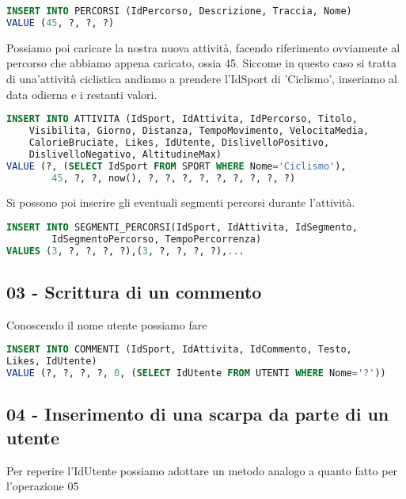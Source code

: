 \documentclass[12pt]{report}
\begin{document}
\begin{lstlisting}[style=sql, language=SQL, label=lst:sql-query]
INSERT INTO PERCORSI (IdPercorso, Descrizione, Traccia, Nome)
VALUE (45, ?, ?, ?)
\end{lstlisting}

Possiamo poi caricare la nostra nuova attività, facendo riferimento ovviamente al percorso
che abbiamo appena caricato, ossia 45. Siccome in questo caso si tratta di una'attività
ciclistica andiamo a prendere l'IdSport di 'Ciclismo', inseriamo al data odierna e i restanti valori.
\begin{lstlisting}[style=sql, language=SQL, label=lst:sql-query]
INSERT INTO ATTIVITA (IdSport, IdAttivita, IdPercorso, Titolo, 
    Visibilita, Giorno, Distanza, TempoMovimento, VelocitaMedia, 
    CalorieBruciate, Likes, IdUtente, DislivelloPositivo, 
    DislivelloNegativo, AltitudineMax)
VALUE (?, (SELECT IdSport FROM SPORT WHERE Nome='Ciclismo'), 
        45, ?, ?, now(), ?, ?, ?, ?, ?, ?, ?, ?, ?)
\end{lstlisting}

Si possono poi inserire gli eventuali segmenti percorsi durante l'attività.

\begin{lstlisting}[style=sql, language=SQL, label=lst:sql-query]
INSERT INTO SEGMENTI_PERCORSI(IdSport, IdAttivita, IdSegmento, 
        IdSegmentoPercorso, TempoPercorrenza) 
VALUES (3, ?, ?, ?, ?),(3, ?, ?, ?, ?),...
\end{lstlisting}

\subsection*{03 - Scrittura di un commento}
Conoscendo il nome utente possiamo fare

\begin{lstlisting}[style=sql, language=SQL, label=lst:sql-query]
INSERT INTO COMMENTI (IdSport, IdAttivita, IdCommento, Testo, 
Likes, IdUtente)
VALUE (?, ?, ?, ?, 0, (SELECT IdUtente FROM UTENTI WHERE Nome='?'))
\end{lstlisting}


\subsection*{04 - Inserimento di una scarpa da parte di un utente}
Per reperire l'IdUtente possiamo adottare un metodo analogo a quanto fatto per
l'operazione 05
\end{document}
